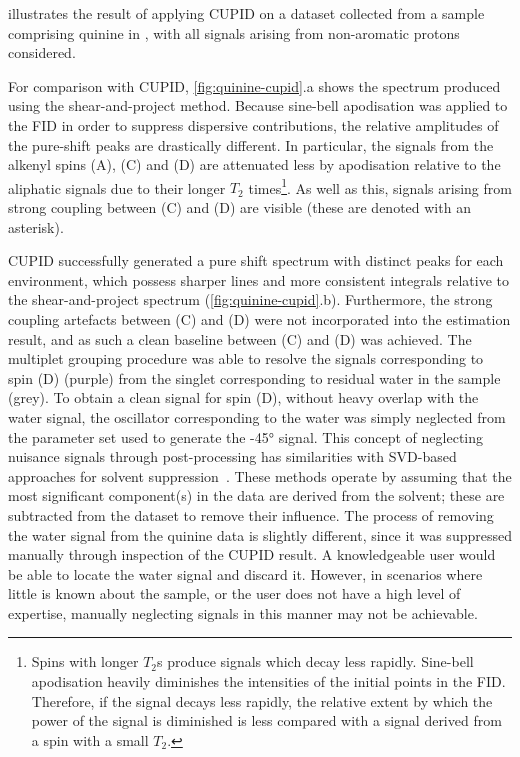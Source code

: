  illustrates the result of applying \ac{CUPID} on
a dataset collected from a sample comprising quinine in ,
with all signals arising from non-aromatic protons considered.

For comparison with \ac{CUPID}, \cref{fig:quinine-cupid}.a shows the
spectrum produced using the shear-and-project method. Because
sine-bell apodisation was applied to the \ac{FID} in order to suppress dispersive
contributions, the relative amplitudes of the pure-shift
peaks are drastically different. In particular, the signals from the alkenyl
spins (A), (C) and (D) are attenuated less by apodisation relative to the
aliphatic signals due to their longer $T_2$ times\footnote{
    Spins with longer $T_2$s produce signals which decay less rapidly.
    Sine-bell apodisation heavily diminishes the intensities of the initial
    points in the \ac{FID}. Therefore, if the signal decays less rapidly, the
    relative extent by which the power of the signal is diminished is less
    compared with a signal derived from a spin with a small $T_2$.
}. As well as this, signals arising from strong coupling between (C) and
(D) are visible (these are denoted with an asterisk).

\ac{CUPID} successfully generated a pure shift spectrum with distinct peaks for
each  environment, which possess sharper lines and more consistent
integrals relative to the shear-and-project spectrum (\cref{fig:quinine-cupid}.b).
Furthermore, the strong coupling artefacts between (C) and (D) were not
incorporated into the estimation result, and as such a clean baseline
between (C) and (D) was achieved.
The multiplet grouping procedure was able to resolve
the signals corresponding to spin (D) (purple) from the singlet corresponding
to residual water in the sample (grey).
To obtain a clean signal for spin (D), without heavy overlap with the water
signal, the oscillator corresponding to the water was simply neglected from
the parameter set used to generate the \ang{-45} signal. This concept of
neglecting nuisance signals through post-processing has similarities with
\ac{SVD}-based approaches for solvent suppression~\cite{Zhu1997}.
These methods operate by assuming that the most significant component(s) in the
data are derived from the solvent; these are subtracted from the dataset to
remove their influence. The process of removing the water signal from the quinine
data is slightly different, since it was suppressed manually through
inspection of the \ac{CUPID} result. A knowledgeable user would be able to
locate the water signal and discard it. However, in scenarios where little is
known about the sample, or the user does not have a high level of expertise,
manually neglecting signals in this manner may not be achievable.

